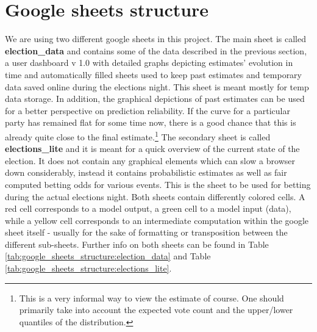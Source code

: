 \documentclass[12pt]{article}
\begin{document}
\section{Google sheets structure}
We are using two different google sheets in this project. The main sheet is called \textbf{election\_data} and contains some of the data described in the previous section, a user dashboard v 1.0 with detailed graphs depicting estimates' evolution in time and automatically filled sheets used to keep past estimates and temporary data saved online during the elections night.
This sheet is meant mostly for temp data storage. In addition, the graphical depictions of past estimates can be used for a better perspective on prediction reliability. If the curve for a particular party has remained flat for some time now, there is a good chance that this is already quite close to the final estimate.\footnote{This is a very informal way to view the estimate of course. One should primarily take into account the expected vote count and the upper/lower quantiles of the distribution.}
The secondary sheet is called \textbf{elections\_lite} and it is meant for a quick overview of the current state of the election. It does not contain any graphical elements which can slow a browser down considerably, instead it contains probabilistic estimates as well as fair computed betting odds for various events. This is the sheet to be used for betting during the actual elections night.
Both sheets contain differently colored cells. A red cell corresponds to a model output, a green cell to a model input (data), while a yellow cell corresponds to an intermediate computation within the google sheet itself - usually for the sake of formatting or transposition between the different sub-sheets. Further info on both sheets can be found in Table \ref{tab:google_sheets_structure:election_data} and Table \ref{tab:google_sheets_structure:elections_lite}.
\end{document}
